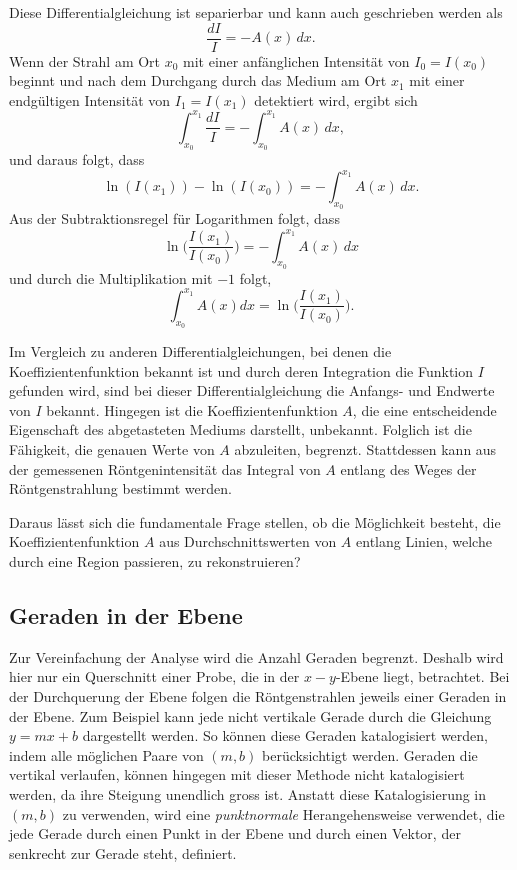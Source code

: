 Diese Differentialgleichung ist separierbar und kann auch geschrieben werden als
\begin{equation}
	\dfrac{dI}{I} = -A(x)\,dx.
\end{equation}
Wenn der Strahl am Ort $x_0$ mit einer anfänglichen Intensität von $I_0 = I(x_0)$ beginnt und nach dem Durchgang durch das Medium am Ort $x_1$ mit einer endgültigen Intensität von $I_1 = I(x_1)$ detektiert wird, ergibt sich 
\begin{equation}
	\int_{x_0}^{x_1} \dfrac{dI}{I} = -\int_{x_0}^{x_1} A(x)\,dx,
\end{equation}
und daraus folgt, dass
\begin{equation}
	\ln (I(x_1)) - \ln (I(x_0)) = -\int_{x_0}^{x_1} A(x)\,dx.
\end{equation}
Aus der Subtraktionsregel für Logarithmen folgt, dass
\begin{equation}
	\ln \biggl(\dfrac{I(x_1)}{I(x_0)}\biggr) = -\int_{x_0}^{x_1} A(x)\,dx
\end{equation}
und durch die Multiplikation mit $-1$ folgt,
\begin{equation}
	\int_{x_0}^{x_1} A(x)dx = \ln \biggl(\dfrac{I(x_1)}{I(x_0)}\biggr).
\end{equation}

Im Vergleich zu anderen Differentialgleichungen, bei denen die Koeffizientenfunktion bekannt ist und durch deren Integration die Funktion $I$ gefunden wird, sind bei dieser Differentialgleichung die Anfangs- und Endwerte von $I$ bekannt. Hingegen ist die Koeffizientenfunktion $A$, die eine entscheidende Eigenschaft des abgetasteten Mediums darstellt, unbekannt. Folglich ist die Fähigkeit, die genauen Werte von $A$ abzuleiten, begrenzt. Stattdessen kann aus der gemessenen Röntgenintensität das Integral von $A$ entlang des Weges der Röntgenstrahlung bestimmt werden.

Daraus lässt sich die fundamentale Frage stellen, ob die Möglichkeit besteht, die Koeffizientenfunktion $A$ aus Durchschnittswerten von $A$ entlang Linien, welche durch eine Region passieren, zu rekonstruieren?

\subsection{Geraden in der Ebene
	\label{ct:subsection:geraden}}
Zur Vereinfachung der Analyse wird die Anzahl Geraden begrenzt. Deshalb wird hier nur ein Querschnitt einer Probe, die in der $x-y$-Ebene liegt, betrachtet. Bei der Durchquerung der Ebene folgen die Röntgenstrahlen jeweils einer Geraden in der Ebene. Zum Beispiel kann jede nicht vertikale Gerade durch die Gleichung $y = mx + b$ dargestellt werden. So können diese Geraden katalogisiert werden, indem alle möglichen Paare von $(m, b)$ berücksichtigt werden. Geraden die vertikal verlaufen, können hingegen mit dieser Methode nicht katalogisiert werden, da ihre Steigung unendlich gross ist. Anstatt diese Katalogisierung in $(m, b)$ zu verwenden, wird eine \emph{punktnormale} Herangehensweise verwendet, die jede Gerade durch einen Punkt in der Ebene und durch einen Vektor, der senkrecht zur Gerade steht, definiert.

